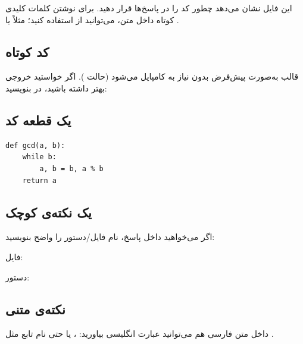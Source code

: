 
این فایل نشان می‌دهد چطور کد را در پاسخ‌ها قرار دهید.
برای نوشتن کلمات کلیدی کوتاه داخل متن، می‌توانید از  استفاده کنید؛ مثلاً  یا .

\subsection{کد کوتاه}
قالب به‌صورت پیش‌فرض بدون نیاز به  کامپایل می‌شود (حالت ).
اگر خواستید خروجی بهتر  داشته باشید، در  بنویسید:

\subsection{یک قطعه کد}
\begin{listing}[H]
	\begin{latin}
		\begin{verbatim}
def gcd(a, b):
    while b:
        a, b = b, a % b
    return a
		\end{verbatim}
	\end{latin}
	\caption{نمونه‌ی کد (Python)}
\end{listing}

\subsection{یک نکته‌ی کوچک}
اگر می‌خواهید داخل پاسخ، نام فایل/دستور را واضح بنویسید:
\begin{ابجد}
\item فایل: 
\item دستور: 
\end{ابجد}

\subsection{نکته‌ی متنی}
داخل متن فارسی هم می‌توانید عبارت انگلیسی بیاورید: ، یا حتی نام تابع مثل .

